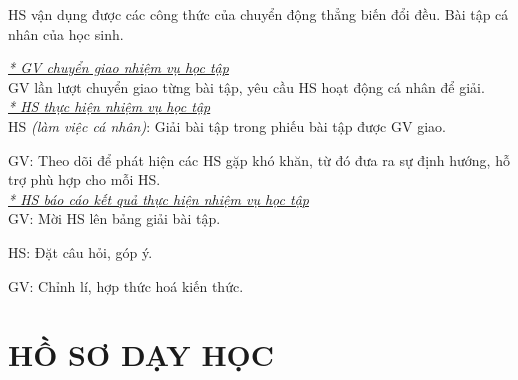 {
HS vận dụng được các công thức của chuyển động thẳng biến đổi đều.
}
{
Bài tập cá nhân của học sinh.
}
{
\textit{\underline{* GV chuyển giao nhiệm vụ học tập}}\\
GV lần lượt chuyển giao từng bài tập, yêu cầu HS hoạt động cá nhân để giải.\\
\textit{\underline{* HS thực hiện nhiệm vụ học tập}}\\
HS \textit{(làm việc cá nhân)}:  Giải bài tập trong phiếu bài tập được GV giao. 

GV: Theo dõi để phát hiện các HS gặp khó khăn, từ đó đưa ra sự định hướng, hỗ trợ phù hợp cho mỗi HS.\\
\textit{\underline{* HS báo cáo kết quả thực hiện nhiệm vụ học tập}}\\
GV: Mời HS lên bảng giải bài tập.

HS: Đặt câu hỏi, góp ý.

GV: Chỉnh lí, hợp thức hoá kiến thức.
}

\section{HỒ SƠ DẠY HỌC}
